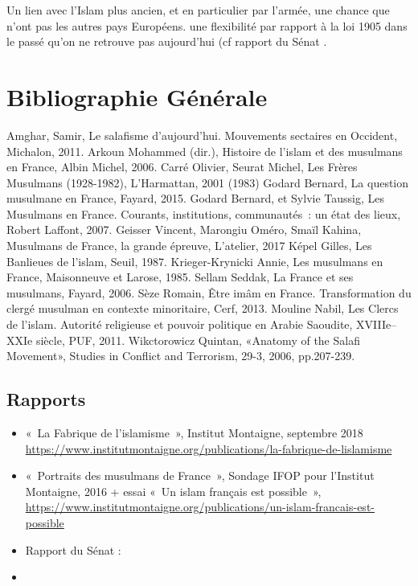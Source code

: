 \ei
 \bi 
 \item Un lien avec l'Islam plus ancien, et en particulier par l'armée, une chance que n'ont pas les autres pays Européens. une flexibilité par rapport à la loi 1905 dans le passé qu'on ne retrouve pas aujourd'hui (cf rapport du Sénat  .
 \item 



\section{Bibliographie Générale}
Amghar, Samir, Le salafisme d’aujourd’hui. Mouvements sectaires en Occident, Michalon, 2011.
Arkoun Mohammed (dir.), Histoire de l’islam et des musulmans en France, Albin Michel, 2006.
Carré Olivier, Seurat Michel, Les Frères Musulmans (1928-1982), L'Harmattan, 2001 (1983)
Godard Bernard, La question musulmane en France, Fayard, 2015.
Godard Bernard, et Sylvie Taussig, Les Musulmans en France. Courants, institutions, communautés : un état des lieux, Robert Laffont, 2007.
Geisser Vincent, Marongiu Oméro, Smaïl Kahina, Musulmans de France, la grande épreuve, L’atelier, 2017
Képel Gilles, Les Banlieues de l’islam, Seuil, 1987.
Krieger-Krynicki Annie, Les musulmans en France, Maisonneuve et Larose, 1985.
Sellam Seddak, La France et ses musulmans, Fayard, 2006.
Sèze Romain, Être imâm en France. Transformation du clergé musulman en contexte minoritaire, Cerf, 2013.
Mouline Nabil, Les Clercs de l’islam. Autorité religieuse et pouvoir politique en Arabie Saoudite, XVIIIe–XXIe siècle, PUF, 2011.
Wikctorowicz Quintan, «Anatomy of the Salafi Movement», Studies in Conflict and Terrorism, 29-3, 2006, pp.207-239.
 \subsection{Rapports}
\begin{itemize}
    \item « La Fabrique de l’islamisme », Institut Montaigne, septembre 2018 \url{https://www.institutmontaigne.org/publications/la-fabrique-de-lislamisme}
    \item « Portraits des musulmans de France », Sondage IFOP pour l’Institut Montaigne, 2016 + essai « Un islam français est possible », \url{https://www.institutmontaigne.org/publications/un-islam-francais-est-possible} 
    \item Rapport du Sénat : \cite{Senat:financementIslam}  
    \item \cite{INED:teo}

\end{itemize}
